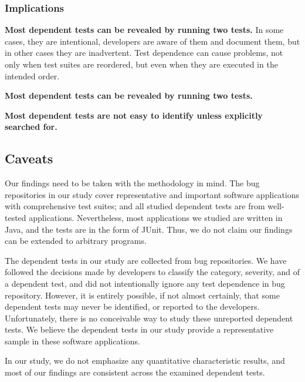 



\subsubsection{Implications}

\vspace{1mm}
\noindent \textbf{Most dependent tests can be revealed by running two tests.}
In some cases, they are intentional, developers are aware
of them and document them, but in other cases they are
inadvertent. Test dependence can cause problems, not only
when test suites are reordered, but even when they are
executed in the intended order.

\vspace{1mm}
\noindent \textbf{Most dependent tests can be revealed by running two tests.}

\vspace{1mm}
\noindent \textbf{Most dependent tests are not easy to identify unless explicitly searched for.}

\subsection{Caveats}

Our findings need to be taken with the methodology in mind. The
bug repositories in our study cover representative and important
software applications with comprehensive test suites; and
all studied dependent tests are from well-tested
applications. Nevertheless, most applications we studied
are written in Java, and the tests are in the form of JUnit.
Thus, we do not claim our findings can be extended to
arbitrary programs.

The dependent tests in our study are collected from bug
repositories. We have followed the decisions made by
developers to classify the category, severity, and
 of a dependent test,
and did not intentionally ignore
any test dependence in bug repository. However,
it is entirely possible, if not almost certainly,
that some dependent tests may never
be identified, or reported to the developers. Unfortunately,
there is no conceivable way to study these unreported
dependent tests. We believe the dependent tests in our study
provide a representative sample in these software applications.

In our study, we do not emphasize any quantitative characteristic
results, and most of our findings are consistent across
the examined dependent tests.
